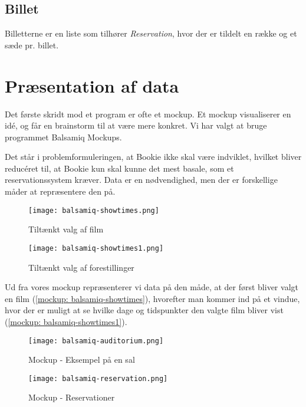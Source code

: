 \subsection{Billet}

Billetterne er en liste som tilhører \textit{Reservation}, hvor der er tildelt en række og et sæde pr. billet. 

\section{Præsentation af data}

Det første skridt mod et program er ofte et mockup. Et mockup visualiserer en idé, og får en brainstorm til at være mere konkret. Vi har valgt at bruge programmet Balsamiq Mockups.

Det står i problemformuleringen, at Bookie ikke skal være indviklet, hvilket bliver reducéret til, at Bookie kun skal kunne det mest basale, som et reservationssystem kræver. Data er en nødvendighed, men der er forskellige måder at repræsentere den på.

\begin{figure}[h]
  \centering
  \begin{minipage}[b]{0.44\linewidth}
  \texttt{[image: balsamiq-showtimes.png]}
  \caption{Tiltænkt valg af film}
  \label{mockup:balsamiq-showtimes}
  \end{minipage}
  \hspace{0.5cm}
  \begin{minipage}[b]{0.46\linewidth}
  \texttt{[image: balsamiq-showtimes1.png]}
  \caption{Tiltænkt valg af forestillinger}
  \label{mockup:balsamiq-showtimes1}
  \end{minipage}
\end{figure}

Ud fra vores mockup repræsenterer vi data på den måde, at der først bliver valgt en film (\ref{mockup: balsamiq-showtimes}), hvorefter man kommer ind på et vindue, hvor der er muligt at se hvilke dage og tidspunkter den valgte film bliver vist (\ref{mockup: balsamiq-showtimes1}).

\begin{figure}[h]
  \centering
  \begin{minipage}[b]{0.42\linewidth}
  \texttt{[image: balsamiq-auditorium.png]}
  \caption{Mockup - Eksempel på en sal}
  \label{mockup: balsamiq-auditorium}
  \end{minipage}
  \hspace{0.5cm}
  \begin{minipage}[b]{0.48\linewidth}
  \texttt{[image: balsamiq-reservation.png]}
  \caption{Mockup - Reservationer}
  \label{mockup: balsamiq-reservation}
  \end{minipage}
\end{figure}

